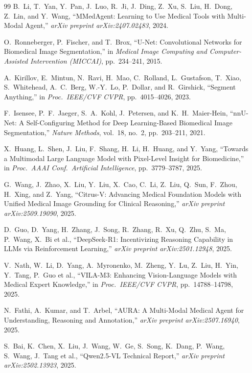 \documentclass[12pt, a4paper]{article}
\begin{document}
\begin{thebibliography}{99}
B.~Li, T.~Yan, Y.~Pan, J.~Luo, R.~Ji, J.~Ding, Z.~Xu, S.~Liu, H.~Dong, Z.~Lin, and
Y.~Wang,
``MMedAgent: Learning to Use Medical Tools with Multi-Modal Agent,''
\textit{arXiv preprint arXiv:2407.02483}, 2024.

O.~Ronneberger, P.~Fischer, and T.~Brox,
``U-Net: Convolutional Networks for Biomedical Image Segmentation,''
in \textit{Medical Image Computing and Computer-Assisted Intervention (MICCAI)},
pp.~234--241, 2015.

A.~Kirillov, E.~Mintun, N.~Ravi, H.~Mao, C.~Rolland, L.~Gustafson, T.~Xiao,
S.~Whitehead, A.~C.~Berg, W.-Y.~Lo, P.~Dollar, and R.~Girshick,
``Segment Anything,''
in \textit{Proc.\ IEEE/CVF CVPR}, pp.~4015--4026, 2023.

F.~Isensee, P.~F.~Jaeger, S.~A.~Kohl, J.~Petersen, and K.~H.~Maier-Hein,
``nnU-Net: A Self-Configuring Method for Deep Learning-Based Biomedical Image
Segmentation,''
\textit{Nature Methods}, vol.~18, no.~2, pp.~203--211, 2021.

X.~Huang, L.~Shen, J.~Liu, F.~Shang, H.~Li, H.~Huang, and Y.~Yang,
``Towards a Multimodal Large Language Model with Pixel-Level Insight for Biomedicine,''
in \textit{Proc.\ AAAI Conf.\ Artificial Intelligence}, pp.~3779--3787, 2025.

G.~Wang, J.~Zhao, X.~Liu, Y.~Liu, X.~Cao, C.~Li, Z.~Liu, Q.~Sun, F.~Zhou, H.~Xing,
and Z.~Yang,
``Citrus-V: Advancing Medical Foundation Models with Unified Medical Image Grounding
for Clinical Reasoning,''
\textit{arXiv preprint arXiv:2509.19090}, 2025.

D.~Guo, D.~Yang, H.~Zhang, J.~Song, R.~Zhang, R.~Xu, Q.~Zhu, S.~Ma, P.~Wang, X.~Bi
et al.,
``DeepSeek-R1: Incentivizing Reasoning Capability in LLMs via Reinforcement Learning,''
\textit{arXiv preprint arXiv:2501.12948}, 2025.

V.~Nath, W.~Li, D.~Yang, A.~Myronenko, M.~Zheng, Y.~Lu, Z.~Liu, H.~Yin, Y.~Tang,
P.~Guo et al.,
``VILA-M3: Enhancing Vision-Language Models with Medical Expert Knowledge,''
in \textit{Proc.\ IEEE/CVF CVPR}, pp.~14788--14798, 2025.

N.~Fathi, A.~Kumar, and T.~Arbel,
``AURA: A Multi-Modal Medical Agent for Understanding, Reasoning and Annotation,''
\textit{arXiv preprint arXiv:2507.16940}, 2025.

S.~Bai, K.~Chen, X.~Liu, J.~Wang, W.~Ge, S.~Song, K.~Dang, P.~Wang, S.~Wang,
J.~Tang et al.,
``Qwen2.5-VL Technical Report,'' \textit{arXiv preprint arXiv:2502.13923}, 2025.


\end{thebibliography}
\end{document}
